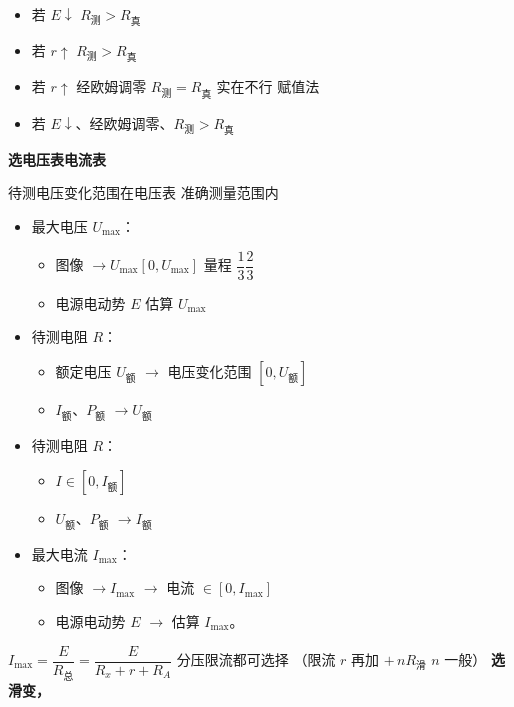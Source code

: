 \begin{itemize}
\item 若 $E\downarrow$ \qquad\qquad $R_{\text{测}}>R_{\text{真}}$
\item 若 $r\uparrow$ \qquad\qquad $R_{\text{测}}>R_{\text{真}}$
\item 若 $r\uparrow$ 经欧姆调零 $R_{\text{测}}=R_{\text{真}}$ \qquad 实在不行 赋值法
\item 若 $E\downarrow$、经欧姆调零、$R_{\text{测}}>R_{\text{真}}$
\end{itemize}
\textbf{选电压表\quad 电流表}

待测电压变化范围在电压表 准确测量范围内

\begin{itemize}
\item 最大电压 $U_{\max}$：
  \begin{itemize}
  \item 图像 $\to U_{\max}[0,U_{\max}]$ \qquad 量程 $\dfrac{1}{3}$\unclear{$\sim$}$\dfrac{2}{3}$
  \item 电源电动势 $E$ 估算 $U_{\max}$
  \end{itemize}
\item 待测电阻 $R$：
  \begin{itemize}
  \item 额定电压 $U_{\text{额}}$ $\to$ 电压变化范围 $[0,U_{\text{额}}]$
  \item $I_{\text{额}}$、$P_{\text{额}}$ $\to U_{\text{额}}$
  \end{itemize}
\item 待测电阻 $R$：
  \begin{itemize}
  \item $I\in[0,I_{\text{额}}]$
  \item $U_{\text{额}}$、$P_{\text{额}}$ $\to I_{\text{额}}$
  \end{itemize}
\item 最大电流 $I_{\max}$：
  \begin{itemize}
  \item 图像 $\to I_{\max}$ $\to$ 电流 $\in[0,I_{\max}]$
  \item 电源电动势 $E$ $\to$ 估算 $I_{\max}$。
  \end{itemize}
\end{itemize}

$I_{\max}=\dfrac{E}{R_{\text{总}}}=\dfrac{E}{R_x+r+R_A}$ \quad 分压限流都可选择 \quad （限流 $r$ 再加 $+\,nR_{\text{滑}}$ \quad $n$ 一般）
\textbf{选滑变，}

